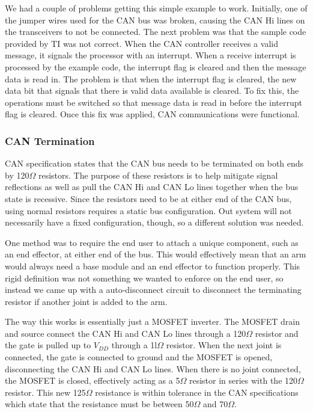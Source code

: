 \noindent We had a couple of problems getting this simple example to work. Initially, one of the jumper wires used for the CAN bus was broken, causing the CAN Hi lines on the transceivers to not be connected. The next problem was that the sample code provided by TI was not correct. When the CAN controller receives a valid message, it signals the processor with an interrupt. When a receive interrupt is processed by the example code, the interrupt flag is cleared and then the message data is read in. The problem is that when the interrupt flag is cleared, the new data bit that signals that there is valid data available is cleared. To fix this, the operations must be switched so that message data is read in before the interrupt flag is cleared. Once this fix was applied, CAN communications were functional.

\subsubsection{CAN Termination}
CAN specification states that the CAN bus needs to be terminated on both ends by 120$\Omega$ resistors. The purpose of these resistors is to help mitigate signal reflections as well as pull the CAN Hi and CAN Lo lines together when the bus state is recessive. Since the resistors need to be at either end of the CAN bus, using normal resistors requires a static bus configuration. Out system will not necessarily have a fixed configuration, though, so a different solution was needed.

\noindent One method was to require the end user to attach a unique component, such as an end effector, at either end of the bus. This would effectively mean that an arm would always need a base module and an end effector to function properly. This rigid definition was not something we wanted to enforce on the end user, so instead we came up with a auto-disconnect circuit to disconnect the terminating resistor if another joint is added to the arm.

\noindent The way this works is essentially just a MOSFET inverter. The MOSFET drain and source connect the CAN Hi and CAN Lo lines through a 120$\Omega$ resistor and the gate is pulled up to $V_{DD}$ through a 1l$\Omega$ resistor. When the next joint is connected, the gate is connected to ground and the MOSFET is opened, disconnecting the CAN Hi and CAN Lo lines. When there is no joint connected, the MOSFET is closed, effectively acting as a 5$\Omega$ resistor in series with the 120$\Omega$ resistor. This new 125$\Omega$ resistance is within tolerance in the CAN specifications which state that the resistance must be between 50$\Omega$ and 70$\Omega$.

